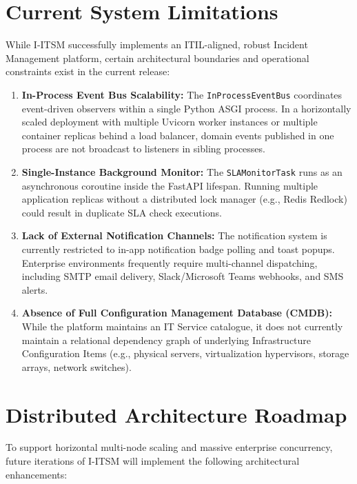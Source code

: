 \documentclass[11pt,a4paper,oneside]{report}
\begin{document}
\section{Current System Limitations}
\label{sec:lim_current}
While I-ITSM successfully implements an ITIL-aligned, robust Incident Management platform, certain architectural boundaries and operational constraints exist in the current release:

\begin{enumerate}
    \item \textbf{In-Process Event Bus Scalability:} The \texttt{InProcessEventBus} coordinates event-driven observers within a single Python ASGI process. In a horizontally scaled deployment with multiple Uvicorn worker instances or multiple container replicas behind a load balancer, domain events published in one process are not broadcast to listeners in sibling processes.
    \item \textbf{Single-Instance Background Monitor:} The \texttt{SLAMonitorTask} runs as an asynchronous coroutine inside the FastAPI lifespan. Running multiple application replicas without a distributed lock manager (e.g., Redis Redlock) could result in duplicate SLA check executions.
    \item \textbf{Lack of External Notification Channels:} The notification system is currently restricted to in-app notification badge polling and toast popups. Enterprise environments frequently require multi-channel dispatching, including SMTP email delivery, Slack/Microsoft Teams webhooks, and SMS alerts.
    \item \textbf{Absence of Full Configuration Management Database (CMDB):} While the platform maintains an IT Service catalogue, it does not currently maintain a relational dependency graph of underlying Infrastructure Configuration Items (e.g., physical servers, virtualization hypervisors, storage arrays, network switches).
\end{enumerate}

\section{Distributed Architecture Roadmap}
\label{sec:future_distributed}
To support horizontal multi-node scaling and massive enterprise concurrency, future iterations of I-ITSM will implement the following architectural enhancements:
\end{document}
